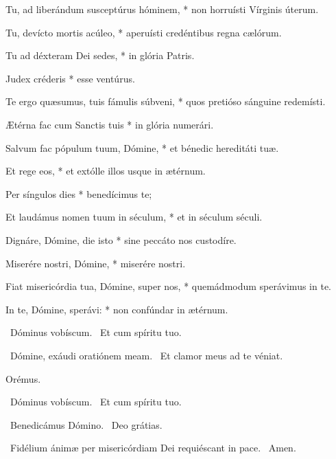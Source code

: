 Tu, ad liberándum susceptúrus hóminem, * non horruísti Vírginis úterum.

Tu, devícto mortis acúleo, * aperuísti credéntibus regna cælórum.

Tu ad déxteram Dei sedes, * in glória Patris.

Judex créderis * esse ventúrus.


Te ergo quæsumus, tuis fámulis súbveni, * quos pretióso sánguine redemísti.

Ætérna fac cum Sanctis tuis * in glória numerári.

Salvum fac pópulum tuum, Dómine, * et bénedic hereditáti tuæ.

Et rege eos, * et extólle illos usque in ætérnum.

Per síngulos dies * benedícimus te;

Et laudámus nomen tuum in séculum, * et in séculum séculi.

Dignáre, Dómine, die isto * sine peccáto nos custodíre.

Miserére nostri, Dómine, * miserére nostri.

Fiat misericórdia tua, Dómine, super nos, * quemádmodum sperávimus in te.

In te, Dómine, sperávi: * non confúndar in ætérnum.



\V\ Dóminus vobíscum. \R\ Et cum spíritu tuo.


\V\ Dómine, exáudi oratiónem meam. \R\ Et clamor meus ad te véniat.

Orémus.



\V\ Dóminus vobíscum. \R\ Et cum spíritu tuo.

\V\ Benedicámus Dómino. \R\ Deo grátias.

\V\ Fidélium ánimæ per misericórdiam Dei requiéscant in pace. \R\ Amen.

